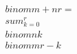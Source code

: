 \documentclass[preview]{standalone}
\begin{document}
\begin{align*}
\quad\\binom{m+n}{r} = \quad\\sum_{k=0}^r \quad\\binom{n}{k} \quad\\binom{m}{r-k}
\end{align*}
\end{document}
